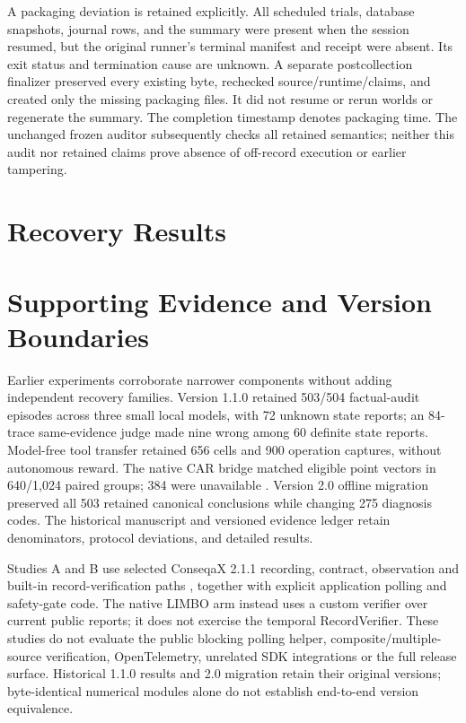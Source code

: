 \documentclass[conference]{IEEEtran}
\begin{document}
A packaging deviation is retained explicitly. All scheduled trials, database snapshots, journal rows, and the summary were present when the session resumed, but the original runner's terminal manifest and receipt were absent. Its exit status and termination cause are unknown. A separate postcollection finalizer preserved every existing byte, rechecked source/runtime/claims, and created only the missing packaging files. It did not resume or rerun worlds or regenerate the summary. The completion timestamp denotes packaging time. The unchanged frozen auditor subsequently checks all retained semantics; neither this audit nor retained claims prove absence of off-record execution or earlier tampering.

\section{Recovery Results}






\section{Supporting Evidence and Version Boundaries}

Earlier experiments corroborate narrower components without adding independent recovery families. Version 1.1.0 retained 503/504 factual-audit episodes across three small local models, with 72 unknown state reports; an 84-trace same-evidence judge made nine wrong among 60 definite state reports. Model-free tool transfer retained 656 cells and 900 operation captures, without autonomous reward. The native CAR bridge matched eligible point vectors in 640/1,024 paired groups; 384 were unavailable \cite{experimentartifact,carcode}. Version 2.0 offline migration preserved all 503 retained canonical conclusions while changing 275 diagnosis codes. The historical manuscript and versioned evidence ledger retain denominators, protocol deviations, and detailed results.

Studies A and B use selected ConseqaX 2.1.1 recording, contract, observation and built-in record-verification paths \cite{artifact}, together with explicit application polling and safety-gate code. The native LIMBO arm instead uses a custom verifier over current public reports; it does not exercise the temporal RecordVerifier. These studies do not evaluate the public blocking polling helper, composite/multiple-source verification, OpenTelemetry, unrelated SDK integrations or the full release surface. Historical 1.1.0 results and 2.0 migration retain their original versions; byte-identical numerical modules alone do not establish end-to-end version equivalence.
\end{document}

